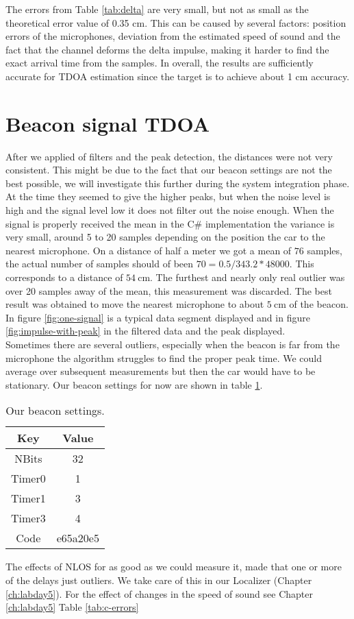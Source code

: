 \documentclass[final]{scrreprt} %
\begin{document}
The errors from Table \ref{tab:delta} are very small, but not as small as the theoretical error value of 0.35 cm.
This can be caused by several factors: position errors of the microphones, deviation from the estimated speed of sound and the fact that the channel deforms the delta impulse, making it harder to find the exact arrival time from the samples.
In overall, the results are sufficiently accurate for TDOA estimation since the target is to achieve about 1 cm accuracy.

\section{Beacon signal TDOA}
After we applied of filters and the peak detection, the distances were not very consistent.
This might be due to the fact that our beacon settings are not the best possible, we will investigate this further during the system integration phase.
At the time they seemed to give the higher peaks, but when the noise level is high and the signal level low it does not filter out the noise enough.
When the signal is properly received the mean in the C\# implementation the variance is very small, around 5 to 20 samples depending on the position the car to the nearest microphone.
On a distance of half a meter we got a mean of $76$ samples, the actual number of samples should of been $70 = 0.5/343.2*48000$.
This corresponds to a distance of $\SI{54}{\centi\meter}$.
The furthest and nearly only real outlier was over 20 samples away of the mean, this measurement was discarded.
The best result was obtained to move the nearest microphone to about $\SI{5}{\centi\meter}$ of the beacon.
In figure \ref{fig:one-signal} is a typical data segment displayed and in figure \ref{fig:impulse-with-peak} in the filtered data and the peak displayed.\\
Sometimes there are several outliers, especially when the beacon is far from the microphone the algorithm struggles to find the proper peak time.
We could average over subsequent measurements but then the car would have to be stationary.
Our beacon settings for now are shown in table \ref{tab:beacon-settings}.
\begin{table} [H]
	\centering
	\begin{tabular} { c | c }
	Key & Value \\ \hline
	NBits & 32 \\
	Timer0 & 1 \\
	Timer1 & 3 \\
	Timer3 & 4 \\
	Code & e65a20e5 \\	
	\end{tabular}
\caption{Our beacon settings.}
\label{tab:beacon-settings}
\end{table}
The effects of NLOS for as good as we could measure it, made that one or more of the delays just outliers.
We take care of this in our Localizer (Chapter \ref{ch:labday5}).
For the effect of changes in the speed of sound see Chapter \ref{ch:labday5} Table \ref{tab:c-errors}
\end{document}
